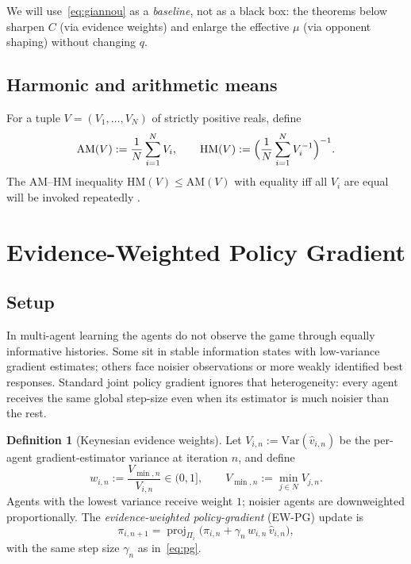 \documentclass{article}
\theoremstyle{plain}
\theoremstyle{definition}
\newtheorem{definition}[theorem]{Definition}
\theoremstyle{remark}
\newcommand{\HM}{\mathrm{HM}}
\newcommand{\AM}{\mathrm{AM}}
\newcommand{\Var}{\mathrm{Var}}
\newcommand{\proj}{\operatorname{proj}}
\begin{document}
We will use~\eqref{eq:giannou} as a \emph{baseline}, not as a black box: the theorems below sharpen $C$ (via evidence weights) and enlarge the effective $\mu$ (via opponent shaping) without changing $q$.

\subsection{Harmonic and arithmetic means}

For a tuple $V=(V_1,\ldots,V_N)$ of strictly positive reals, define
\begin{equation}\label{eq:amhm}
\AM(V) := \frac{1}{N}\sum_{i=1}^N V_i, \qquad
\HM(V) := \Bigl(\frac{1}{N}\sum_{i=1}^N V_i^{-1}\Bigr)^{-1}.
\end{equation}
The AM--HM inequality $\HM(V)\le\AM(V)$ with equality iff all $V_i$ are equal will be invoked repeatedly \citep{HardyLittlewoodPolya1952}.

\section{Evidence-Weighted Policy Gradient}

\subsection{Setup}

In multi-agent learning the agents do not observe the game through equally informative histories. Some sit in stable information states with low-variance gradient estimates; others face noisier observations or more weakly identified best responses. Standard joint policy gradient ignores that heterogeneity: every agent receives the same global step-size even when its estimator is much noisier than the rest.

\begin{definition}[Keynesian evidence weights]\label{def:evw}
Let $V_{i,n} := \Var(\hat v_{i,n})$ be the per-agent gradient-estimator variance at iteration $n$, and define
\begin{equation}\label{eq:ewweights}
w_{i,n} := \frac{V_{\min,n}}{V_{i,n}}\in(0,1], \qquad V_{\min,n} := \min_{j\in N} V_{j,n}.
\end{equation}
Agents with the lowest variance receive weight $1$; noisier agents are downweighted proportionally. The \emph{evidence-weighted policy-gradient} (EW-PG) update is
\begin{equation}\label{eq:ew-update}
\pi_{i,n+1} = \proj_{\Pi_i}\!\bigl(\pi_{i,n} + \gamma_n\, w_{i,n}\, \hat v_{i,n}\bigr),
\end{equation}
with the same step size $\gamma_n$ as in~\eqref{eq:pg}.
\end{definition}
\end{document}
